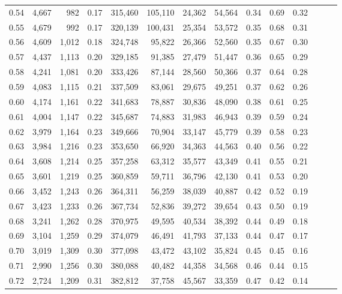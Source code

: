 \begin{tabular}{rrrrrrrrrrrrrr}
0.54 &  4,667 &    982 &  0.17 &  315,460 &  105,110 &  24,362 &  54,564 &  0.34 &  0.69 &      0.32 \\
0.55 &  4,679 &    992 &  0.17 &  320,139 &  100,431 &  25,354 &  53,572 &  0.35 &  0.68 &      0.31 \\
0.56 &  4,609 &  1,012 &  0.18 &  324,748 &   95,822 &  26,366 &  52,560 &  0.35 &  0.67 &      0.30 \\
0.57 &  4,437 &  1,113 &  0.20 &  329,185 &   91,385 &  27,479 &  51,447 &  0.36 &  0.65 &      0.29 \\
0.58 &  4,241 &  1,081 &  0.20 &  333,426 &   87,144 &  28,560 &  50,366 &  0.37 &  0.64 &      0.28 \\
0.59 &  4,083 &  1,115 &  0.21 &  337,509 &   83,061 &  29,675 &  49,251 &  0.37 &  0.62 &      0.26 \\
0.60 &  4,174 &  1,161 &  0.22 &  341,683 &   78,887 &  30,836 &  48,090 &  0.38 &  0.61 &      0.25 \\
0.61 &  4,004 &  1,147 &  0.22 &  345,687 &   74,883 &  31,983 &  46,943 &  0.39 &  0.59 &      0.24 \\
0.62 &  3,979 &  1,164 &  0.23 &  349,666 &   70,904 &  33,147 &  45,779 &  0.39 &  0.58 &      0.23 \\
0.63 &  3,984 &  1,216 &  0.23 &  353,650 &   66,920 &  34,363 &  44,563 &  0.40 &  0.56 &      0.22 \\
0.64 &  3,608 &  1,214 &  0.25 &  357,258 &   63,312 &  35,577 &  43,349 &  0.41 &  0.55 &      0.21 \\
0.65 &  3,601 &  1,219 &  0.25 &  360,859 &   59,711 &  36,796 &  42,130 &  0.41 &  0.53 &      0.20 \\
0.66 &  3,452 &  1,243 &  0.26 &  364,311 &   56,259 &  38,039 &  40,887 &  0.42 &  0.52 &      0.19 \\
0.67 &  3,423 &  1,233 &  0.26 &  367,734 &   52,836 &  39,272 &  39,654 &  0.43 &  0.50 &      0.19 \\
0.68 &  3,241 &  1,262 &  0.28 &  370,975 &   49,595 &  40,534 &  38,392 &  0.44 &  0.49 &      0.18 \\
0.69 &  3,104 &  1,259 &  0.29 &  374,079 &   46,491 &  41,793 &  37,133 &  0.44 &  0.47 &      0.17 \\
0.70 &  3,019 &  1,309 &  0.30 &  377,098 &   43,472 &  43,102 &  35,824 &  0.45 &  0.45 &      0.16 \\
0.71 &  2,990 &  1,256 &  0.30 &  380,088 &   40,482 &  44,358 &  34,568 &  0.46 &  0.44 &      0.15 \\
0.72 &  2,724 &  1,209 &  0.31 &  382,812 &   37,758 &  45,567 &  33,359 &  0.47 &  0.42 &      0.14 \\

\end{tabular}
